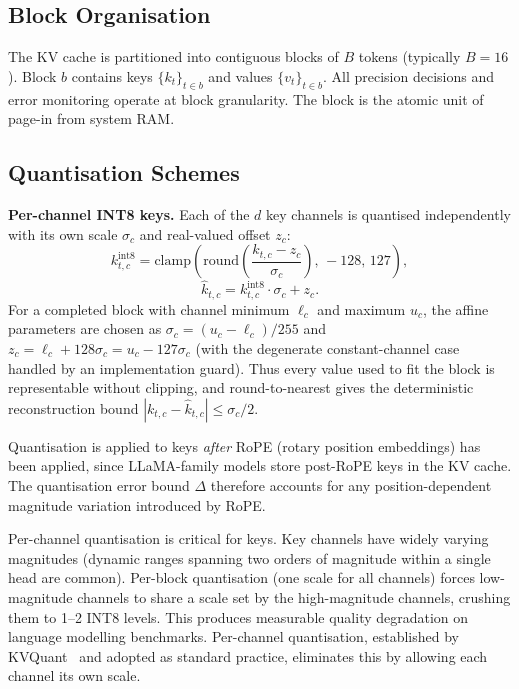 \documentclass[10pt,twocolumn,a4paper]{article}
\theoremstyle{definition}
\theoremstyle{remark}
\begin{document}
\subsection{Block Organisation}

The KV cache is partitioned into contiguous blocks of $B$ tokens (typically $B = 16$).  Block $b$ contains keys $\{k_t\}_{t \in b}$ and values $\{v_t\}_{t \in b}$.  All precision decisions and error monitoring operate at block granularity.  The block is the atomic unit of page-in from system RAM.

\subsection{Quantisation Schemes}
\label{sec:quant_schemes}

\textbf{Per-channel INT8 keys.}  Each of the $d$ key channels is quantised independently with its own scale $\sigma_c$ and real-valued offset $z_c$:
\begin{equation}
  k_{t,c}^{\mathrm{int8}} = \mathrm{clamp}\!\left(\mathrm{round}\!\left(\frac{k_{t,c} - z_c}{\sigma_c}\right),\, -128,\, 127\right),
\end{equation}
\begin{equation}
  \hat{k}_{t,c} = k_{t,c}^{\mathrm{int8}} \cdot \sigma_c + z_c.
\end{equation}
For a completed block with channel minimum $\ell_c$ and maximum $u_c$, the affine parameters are chosen as $\sigma_c=(u_c-\ell_c)/255$ and $z_c=\ell_c+128\sigma_c=u_c-127\sigma_c$ (with the degenerate constant-channel case handled by an implementation guard).  Thus every value used to fit the block is representable without clipping, and round-to-nearest gives the deterministic reconstruction bound $|k_{t,c}-\hat{k}_{t,c}|\leq \sigma_c/2$.

Quantisation is applied to keys \emph{after} RoPE (rotary position embeddings) has been applied, since LLaMA-family models store post-RoPE keys in the KV cache.  The quantisation error bound $\Delta$ therefore accounts for any position-dependent magnitude variation introduced by RoPE\@.

Per-channel quantisation is critical for keys.  Key channels have widely varying magnitudes (dynamic ranges spanning two orders of magnitude within a single head are common).  Per-block quantisation (one scale for all channels) forces low-magnitude channels to share a scale set by the high-magnitude channels, crushing them to 1--2 INT8 levels.  This produces measurable quality degradation on language modelling benchmarks.  Per-channel quantisation, established by KVQuant~\cite{kvquant} and adopted as standard practice, eliminates this by allowing each channel its own scale.
\end{document}
